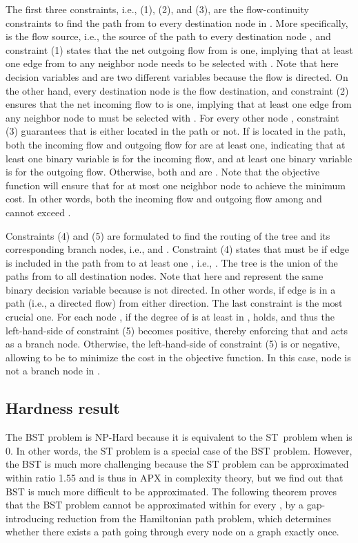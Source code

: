 \documentclass[conference]{IEEEtran}
\begin{document}
The first three constraints, i.e., (1), (2), and (3), are the flow-continuity constraints to find the
path from  to every destination node  in . More specifically,  is the
flow source, i.e., the source of the path to every destination node , and
constraint (1) states that the net outgoing flow from  is one, implying
that at least one edge  from  to any neighbor node  needs to
be selected with . Note that here decision variables  and  are two different variables because the flow is
directed. On the other hand, every destination node  is the flow destination,
and constraint (2) ensures that the net incoming flow to  is one,
implying that at least one edge  from any neighbor node  to 
must be selected with . For every other node , constraint
(3) guarantees that  is either located in the path or not. If  is
located in the path, both the incoming flow and outgoing flow for  are at
least one, indicating that at least one binary variable  is 
for the incoming flow, and at least one binary variable  is 
for the outgoing flow. Otherwise, both  and  are
. Note that the objective function will ensure that  for
at most one neighbor node  to achieve the minimum cost. In other words,
both the incoming flow and outgoing flow among  and  cannot exceed .

Constraints (4) and (5) are formulated to find the routing of the tree and
its corresponding branch nodes, i.e.,  and .
Constraint (4) states that  must be  if edge  is
included in the path from  to at least one , i.e., . The tree  is the
union of the paths from  to all destination nodes. Note that here  and  represent the same binary
decision variable because  is not directed. In other words,  if edge  is in a path (i.e., a directed flow) from either
direction. The last constraint is the most crucial one. For each node ,
if the degree of  is at least  in ,  holds, and thus the left-hand-side of
constraint (5) becomes positive, thereby enforcing that  and  acts as a branch node. Otherwise, the left-hand-side of constraint (5)
is  or negative, allowing  to be  to minimize the cost in
the objective function. In this case, node  is not a branch node in .

\subsection{Hardness result}

The BST problem is NP-Hard because it is equivalent to the ST\ problem when  is 0. In other words, the ST problem is a special case of the BST
problem. However, the BST is much more challenging because the ST problem
can be approximated within ratio 1.55 \cite{Robins2000} and is thus in APX in
complexity theory, but we find out that BST is much more difficult to be
approximated. The following theorem proves that the BST problem cannot be
approximated within  for every , by a gap-introducing reduction
from the Hamiltonian path problem, which determines whether there exists a
path going through every node on a graph exactly once.
\end{document}
